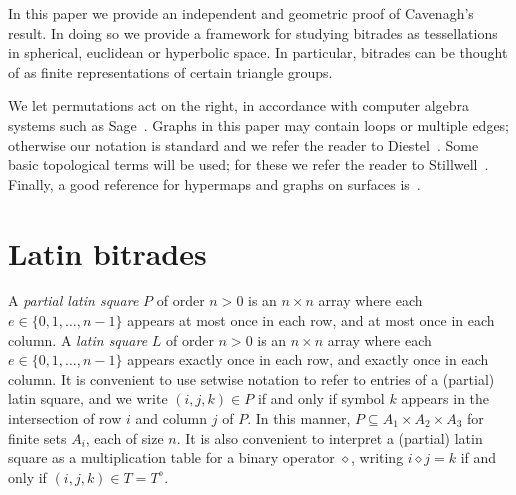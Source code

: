 \documentclass[amstags,fleqn,reqno]{article}
\theoremstyle{plain}
\theoremstyle{definition}
\newcommand{\opa}{\diamond}
\begin{document}
In this paper we provide an independent
and geometric proof of Cavenagh's result. In doing so we provide a
framework for studying bitrades as tessellations in spherical, euclidean
or hyperbolic space.
In particular, bitrades can be thought of as finite representations of
certain triangle groups.

We let permutations act on the right, in accordance with computer
algebra systems such as Sage~\cite{sage}.
Graphs in this paper may contain loops or multiple edges; otherwise our
notation is standard and we refer the reader to
Diestel~\cite{MR2159259}. Some basic topological terms will be used; for
these we refer the reader to Stillwell~\cite{MR1211642}. Finally, a good
reference for hypermaps and graphs on surfaces is~\cite{LZ}.


\section{Latin bitrades}

A {\em partial latin square} $P$ of order $n > 0$ is an 
$n \times n$ array where each $e \in \{ 0, 1, \dots, n-1 \}$
appears at most once in each row, and at most once in each column.
A {\em latin square} $L$ of order $n > 0$ is an
$n \times n$ array where each $e \in \{ 0, 1, \dots, n-1 \}$
appears exactly once in each row, and exactly once in each column.
It is convenient to use setwise notation to refer to entries
of a (partial) latin square, and we
write $(i,j,k) \in P$ if and only if symbol $k$ appears in the
intersection of row $i$ and column $j$ of $P$.
In this manner, $P \subseteq A_1 \times A_2 \times A_3$ for finite sets
$A_i$, each of size $n$.
It is also convenient to interpret a (partial) latin square as a multiplication
table for a binary operator $\opa$, writing
$i \opa j = k$ if and only if $(i,j,k) \in T = T^{\opa}$.

\end{document}
